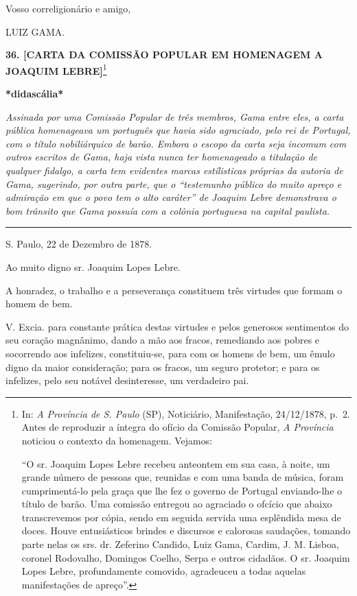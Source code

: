 Vosso correligionário e amigo,

LUIZ GAMA.

\textbf{36. {[}CARTA DA COMISSÃO POPULAR EM HOMENAGEM A JOAQUIM
LEBRE{]}}\footnote{In: \emph{A Província de S. Paulo} (SP), Noticiário,
  Manifestação, 24/12/1878, p.~2. Antes de reproduzir a íntegra do
  ofício da Comissão Popular, \emph{A Província} noticiou o contexto da
  homenagem. Vejamos:

  ``O sr. Joaquim Lopes Lebre recebeu anteontem em sua casa, à noite, um
  grande número de pessoas que, reunidas e com uma banda de música,
  foram cumprimentá-lo pela graça que lhe fez o governo de Portugal
  enviando-lhe o título de barão. Uma comissão entregou ao agraciado o
  ofcício que abaixo transcrevemos por cópia, sendo em seguida servida
  uma esplêndida mesa de doces. Houve entusiásticos brindes e discursos
  e calorosas saudações, tomando parte nelas os srs. dr. Zeferino
  Candido, Luiz Gama, Cardim, J. M. Lisboa, coronel Rodovalho, Domingos
  Coelho, Serpa e outros cidadãos. O sr. Joaquim Lopes Lebre,
  profundamente comovido, agradeuceu a todas aquelas manifestações de
  apreço''.}

\textbf{*didascália*}

\emph{Assinada por uma Comissão Popular de três membros, Gama entre
eles, a carta pública homenageava um português que havia sido agraciado,
pelo rei de Portugal, com o título nobiliárquico de barão. Embora o
escopo da carta seja incomum com outros escritos de Gama, haja vista
nunca ter homenageado a titulação de qualquer fidalgo, a carta tem
evidentes marcas estílisticas próprias da autoria de Gama, sugerindo,
por outra parte, que o ``testemunho público do muito apreço e admiração
em que o povo tem o alto caráter'' de Joaquim Lebre demonstrava o bom
trânsito que Gama possuía com a colônia portuguesa na capital paulista.}

\begin{center}\rule{0.5\linewidth}{\linethickness}\end{center}

S. Paulo, 22 de Dezembro de 1878.

Ao muito digno sr. Joaquim Lopes Lebre.

A honradez, o trabalho e a perseverança constituem três virtudes que
formam o homem de bem.

V. Excia. para constante prática destas virtudes e pelos generosos
sentimentos do seu coração magnânimo, dando a mão aos fracos, remediando
aos pobres e socorrendo aos infelizes, constituiu-se, para com os homens
de bem, um êmulo digno da maior consideração; para os fracos, um seguro
protetor; e para os infelizes, pelo seu notável desinteresse, um
verdadeiro pai.

